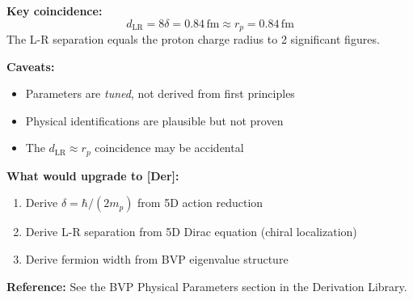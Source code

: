 \begin{tcolorbox}[
    colback=yellow!5!white,
    colframe=orange!75!black,
    title={\textbf{BVP Tuning: Why These Parameters Work}},
    fonttitle=\bfseries
]
\textbf{Key coincidence:}
\[
d_{\text{LR}} = 8\delta = 0.84\,\text{fm} \approx r_p = 0.84\,\text{fm}
\]
The L-R separation equals the proton charge radius to 2 significant figures.

\vspace{0.5em}
\textbf{Caveats:}
\begin{itemize}[leftmargin=*, itemsep=0pt]
    \item Parameters are \textit{tuned}, not derived from first principles
    \item Physical identifications are plausible but not proven
    \item The $d_{\text{LR}} \approx r_p$ coincidence may be accidental
\end{itemize}

\textbf{What would upgrade to [Der]:}
\begin{enumerate}[leftmargin=*, itemsep=0pt]
    \item Derive $\delta = \hbar/(2m_p)$ from 5D action reduction
    \item Derive L-R separation from 5D Dirac equation (chiral localization)
    \item Derive fermion width from BVP eigenvalue structure
\end{enumerate}

\textbf{Reference:} See the BVP Physical Parameters section in the Derivation Library.

\end{tcolorbox}


